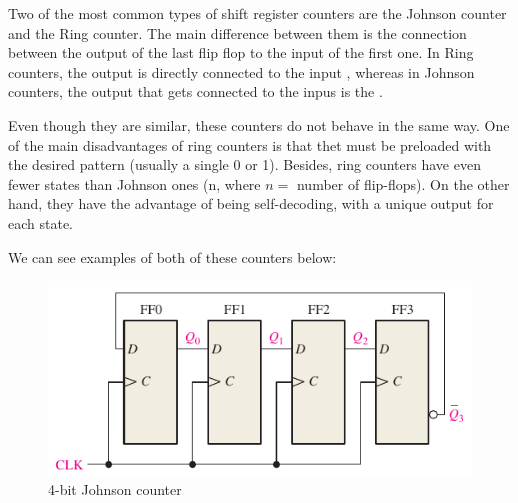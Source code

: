 Two of the most common types of shift register counters are the Johnson counter and the Ring counter. The main difference between them is the connection between the output of the last flip flop to the input of the first one. In Ring counters, the output  is directly connected to the input , whereas in Johnson counters, the output that gets connected to the inpus is the . \medskip

Even though they are similar, these counters do not behave in the same way. One of the main disadvantages of ring counters is that thet must be preloaded with the desired pattern (usually a single 0 or 1). Besides, ring counters have even fewer states than Johnson ones (n, where $n = $ number of flip-flops). On the other hand, they have the advantage of being self-decoding, with a unique output for each state.\medskip

We can see examples of both of these counters below:

\begin{figure}[H]
    \centering
    \includegraphics[scale = 0.8]{Graphics/VHDL/Practice 5/COUNTERS/Johnson_Counter_467.pdf}
    \caption{4-bit Johnson counter ~\autocite{FLOYD}}
    \label{fig:JOHNSON_4_BIT}
\end{figure}

